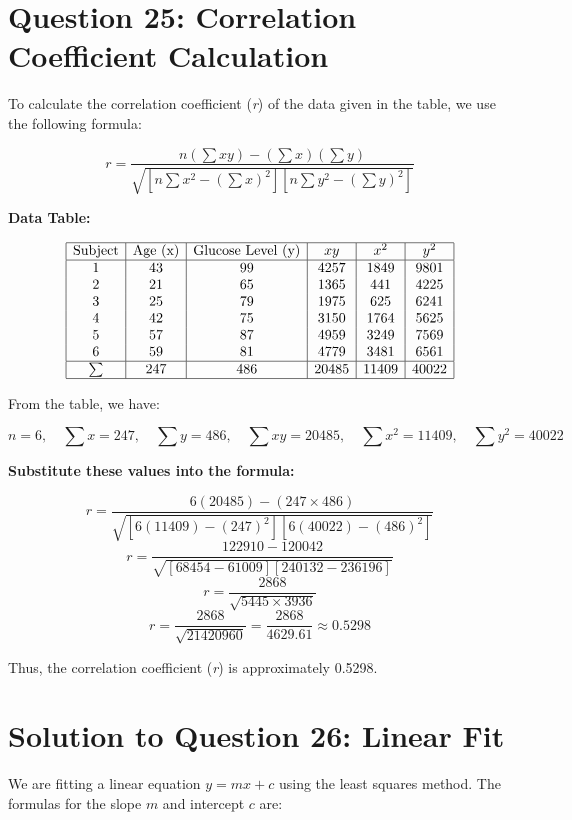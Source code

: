 \documentclass[11pt]{article}
\begin{document}
\section*{Question 25: Correlation Coefficient Calculation}

To calculate the correlation coefficient (\textit{r}) of the data given in the table, we use the following formula:

\[
r = \frac{n(\sum xy) - (\sum x)(\sum y)}{\sqrt{[n\sum x^2 - (\sum x)^2][n\sum y^2 - (\sum y)^2]}}
\]

\textbf{Data Table:}

\[
\begin{array}{|c|c|c|c|c|c|}
\hline
\text{Subject} & \text{Age (x)} & \text{Glucose Level (y)} & xy & x^2 & y^2 \\
\hline
1 & 43 & 99 & 4257 & 1849 & 9801 \\
2 & 21 & 65 & 1365 & 441 & 4225 \\
3 & 25 & 79 & 1975 & 625 & 6241 \\
4 & 42 & 75 & 3150 & 1764 & 5625 \\
5 & 57 & 87 & 4959 & 3249 & 7569 \\
6 & 59 & 81 & 4779 & 3481 & 6561 \\
\hline
\sum & 247 & 486 & 20485 & 11409 & 40022 \\
\hline
\end{array}
\]

From the table, we have:

\[
n = 6, \quad \sum x = 247, \quad \sum y = 486, \quad \sum xy = 20485, \quad \sum x^2 = 11409, \quad \sum y^2 = 40022
\]

\textbf{Substitute these values into the formula:}

\[
r = \frac{6(20485) - (247 \times 486)}{\sqrt{[6(11409) - (247)^2][6(40022) - (486)^2]}}
\]
\[
r = \frac{122910 - 120042}{\sqrt{[68454 - 61009][240132 - 236196]}}
\]
\[
r = \frac{2868}{\sqrt{5445 \times 3936}}
\]
\[
r = \frac{2868}{\sqrt{21420960}} = \frac{2868}{4629.61} \approx 0.5298
\]

Thus, the correlation coefficient (\textit{r}) is approximately 0.5298.






\section*{Solution to Question 26: Linear Fit}

We are fitting a linear equation \( y = mx + c \) using the least squares method. The formulas for the slope \( m \) and intercept \( c \) are:
\end{document}
